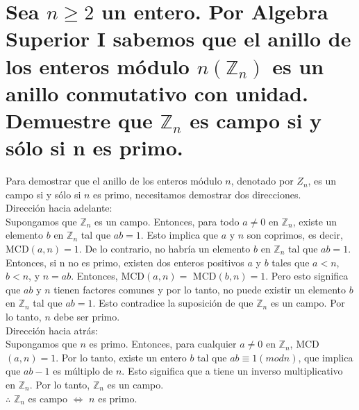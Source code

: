 \section{Sea $n \geq 2$ un entero. Por Algebra Superior I sabemos que el anillo de los enteros módulo $n (\mathbb{Z}_n)$ es un anillo conmutativo con unidad. Demuestre que $\mathbb{Z}_n$ es campo si y sólo si n es primo.}

Para demostrar que el anillo de los enteros módulo $n$,
denotado por $Z_n$, es un campo si y sólo si $n$ es primo,
necesitamos demostrar dos direcciones.\\
Dirección hacia adelante:\\
Supongamos que $\mathbb{Z}_n$ es un campo.
Entonces, para todo $a \neq 0$ en $\mathbb{Z}_n$, existe un elemento $b$ en $\mathbb{Z}_n$ tal que $ab = 1$.
Esto implica que $a$ y $n$ son coprimos, es decir, MCD$(a,n) = 1$. De lo contrario, no habría un elemento $b$ en $\mathbb{Z}_n$ tal que $ab = 1$.
Entonces, si n no es primo, existen dos enteros positivos $a$ y $b$ tales que $a < n$, $b < n$, y $n = ab$.
Entonces, MCD$(a,n) =$ MCD$(b,n) = 1$. Pero esto significa que $ab$ y $n$ tienen factores comunes y por lo tanto, no puede existir un elemento $b$ en $\mathbb{Z}_n$ tal que $ab = 1$.
Esto contradice la suposición de que $\mathbb{Z}_n$ es un campo. Por lo tanto, $n$ debe ser primo.\\
Dirección hacia atrás:\\
Supongamos que $n$ es primo.
Entonces, para cualquier $a \neq 0$ en $\mathbb{Z}_n$, MCD$(a,n) = 1$.
Por lo tanto, existe un entero $b$ tal que $ab \equiv 1 (mod n)$, que implica que $ab - 1$ es múltiplo de $n$.
Esto significa que a tiene un inverso multiplicativo en $\mathbb{Z}_n$. Por lo tanto, $\mathbb{Z}_n$ es un campo.\\
$\therefore$   $\mathbb{Z}_n$ es campo $\Leftrightarrow$ $n$ es primo.